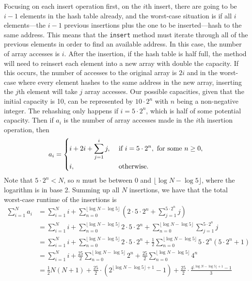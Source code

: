 \documentclass[11pt]{article}
\begin{document}
    Focusing on each insert operation first, on the \(i\)th insert, there are going to be \(i-1\) elements in the hash table already, and the worst-case situation is if all \(i\) elements---the \(i-1\) previous insertions plus the one to be inserted---hash to the same address. This means that the \texttt{insert} method must iterate through all of the previous elements in order to find an available address. In this case, the number of array accesses is \(i\). After the insertion, if the hash table is half full, the method will need to reinsert each element into a new array with double the capacity. If this occurs, the number of accesses to the original array is \(2i\) and in the worst-case where every element hashes to the same address in the new array, inserting the \(j\)th element will take \(j\) array accesses. Our possible capacities, given that the initial capacity is 10, can be represented by \(10 \cdot 2^n\) with \(n\) being a non-negative integer. The rehashing only happens if \(i = 5 \cdot 2^n\), which is half of some potential capacity. Then if \(a_i\) is the number of array accesses made in the \(i\)th insertion operation, then
    \[
        a_i = \begin{dcases}
            i + 2i + \sum_{j=1}^{i} j, &\text{ if } i = 5 \cdot 2^n, \text{ for some }  n \geq 0,\\
            i, &\text{ otherwise} .
        \end{dcases}
    \]
    Note that \(5\cdot 2^n < N\), so \(n\) must be between 0 and \(\lfloor\log N - \log 5\rfloor\), where the logarithm is in base 2. Summing up all \(N\) insertions, we have that the total worst-case runtime of the insertions is
    \begin{align*}
        \sum_{i=1}^{N} a_i &= \sum_{i=1}^{N} i + \sum_{n=0}^{\lfloor \log N  - \log 5 \rfloor} \left( 2\cdot 5\cdot 2^n + \sum_{j=1}^{5 \cdot 2^n} j \right) \\
        &= \sum_{i=1}^{N} i + \sum_{n=0}^{\lfloor \log N - \log 5\rfloor} 2\cdot 5\cdot 2^n + \sum_{n=0}^{\lfloor \log N - \log 5\rfloor}\sum_{j=1}^{5 \cdot 2^n} j \\
        &= \sum_{i=1}^{N} i + \sum_{n=0}^{\lfloor \log N - \log 5\rfloor} 2\cdot 5\cdot 2^n + \frac{1}{2}\sum_{n=0}^{\lfloor \log N - \log 5\rfloor} 5\cdot 2^n(5 \cdot 2^n + 1) \\
        &=\sum_{i=1}^{N} i + \frac{25}{2} \sum_{n=0}^{\lfloor \log N - \log 5\rfloor} 2^n + \frac{25}{2}\sum_{n=0}^{\lfloor \log N - \log 5\rfloor} 4^n \\
        &= \frac{1}{2}N(N+1)+\frac{25}{2} \cdot (2^{\lfloor \log N - \log 5\rfloor + 1} - 1) + \frac{25}{2} \cdot \frac{4^{\lfloor \log N - \log 5\rfloor + 1} - 1}{3}
    \end{align*}
\end{document}
